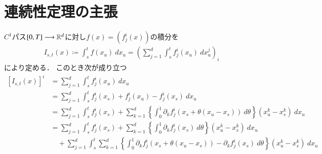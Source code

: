 \section{連続性定理の主張}
	$C^1$パス$[0,T] \longrightarrow \mathbb{R}^d$に対し$f(x) = (f_j^i(x))$の積分を
	\begin{align}
		I_{s,t} (x)
		\coloneqq \int_s^t f(x_u)\ dx_u
		= \left( \sum_{j=1}^d \int_s^t f_j^i(x_u)\ dx^j_u \right)_i
	\end{align}
	により定める．
	このとき次が成り立つ
	\begin{align}
		\left[ I_{s,t}(x) \right]^i
		&= \sum_{j=1}^d \int_s^t f_j^i(x_u)\ dx_u \\
		&= \sum_{j=1}^d \int_s^t f_j^i(x_s) + f_j^i(x_u) - f_j^i(x_s)\ dx_u \\
		&= \sum_{j=1}^d \int_s^t f_j^i(x_s) 
			+ \sum_{k=1}^d  \left\{ \int_0^1 \partial_k f_j^i(x_s + \theta(x_u - x_s))\ d\theta \right\} (x^k_u - x^k_s)\ dx_u \\
		&= \sum_{j=1}^d \int_s^t f_j^i(x_s) + \sum_{k=1}^d  \left\{ \int_0^1 \partial_k f_j^i(x_s)\ d\theta \right\} (x^k_u - x^k_s)\ dx_u \\
			&\quad + \sum_{j=1}^d \int_s^t \sum_{k=1}^d  \left\{ \int_0^1 \partial_k f_j^i(x_s + \theta(x_u - x_s)) - \partial_k f_j^i(x_s)\ d\theta \right\} (x^k_u - x^k_s)\ dx_u \\
	\end{align}

